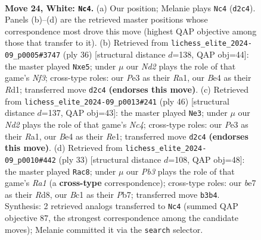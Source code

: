 \documentclass[11pt]{article}
\begin{document}
\clearpage

\begin{figure}[p]\centering
\begin{subfigure}{0.46\textwidth}\centering
\resizebox{\linewidth}{!}{%
\newchessgame
\chessboard[
  setfen={rnb5/1p1nb1k1/p2rppp1/7p/4B3/1P2P1P1/P1pNPK1P/R1B1R3 w - - 4 24},
  showmover=false,
  pgfstyle=straightmove, color=movearrow, markmove={d2-c4}
]}
\caption{}
\end{subfigure}\hfill
\begin{subfigure}{0.46\textwidth}\centering
\resizebox{\linewidth}{!}{%
\newchessgame
\chessboard[
  setfen={r2r4/1b1nkppp/p3p3/1p2n3/P1p1P3/2P1BNP1/1P3P1P/R2R1BK1 w - - 2 19},
  showmover=false,
  pgfstyle=straightmove, color=movearrow, markmove={f3-e5}
]}
\caption{}
\end{subfigure}
\\[4pt]
\begin{subfigure}{0.46\textwidth}\centering
\resizebox{\linewidth}{!}{%
\newchessgame
\chessboard[
  setfen={3n1rk1/p1rbb1pp/4pp2/Ppp5/2N2P2/2P3PB/1P3B1P/R3R1K1 w - - 0 24},
  showmover=false,
  pgfstyle=straightmove, color=movearrow, markmove={c4-e3}
]}
\caption{}
\end{subfigure}\hfill
\begin{subfigure}{0.46\textwidth}\centering
\resizebox{\linewidth}{!}{%
\newchessgame
\chessboard[
  setfen={r2r2k1/pp2ppbp/n5p1/3nPb2/1P6/P4NP1/1B1N1PBP/R3R1K1 b - - 3 17},
  showmover=false,
  pgfstyle=straightmove, color=movearrow, markmove={a8-c8}
]}
\caption{}
\end{subfigure}
\caption{\textbf{Move 24, White: \texttt{Nc4}.} (a) Our position; Melanie plays \texttt{Nc4} (\texttt{d2c4}). Panels (b)--(d) are the retrieved master positions whose correspondence most drove this move (highest QAP objective among those that transfer to it). (b) Retrieved from \texttt{lichess\_elite\_2024-09\_p0005\#3747} (ply 36) [structural distance $d$=138, QAP obj=44]: the master played \texttt{Nxe5}; under $\mu$ our \emph{Nd2} plays the role of that game's \emph{Nf3}; cross-type roles: our \emph{P}e3 as their \emph{R}a1, our \emph{B}e4 as their \emph{R}d1; transferred move \texttt{d2c4} \textbf{(endorses this move)}. (c) Retrieved from \texttt{lichess\_elite\_2024-09\_p0013\#241} (ply 46) [structural distance $d$=137, QAP obj=43]: the master played \texttt{Ne3}; under $\mu$ our \emph{Nd2} plays the role of that game's \emph{Nc4}; cross-type roles: our \emph{P}e3 as their \emph{R}a1, our \emph{B}e4 as their \emph{R}e1; transferred move \texttt{d2c4} \textbf{(endorses this move)}. (d) Retrieved from \texttt{lichess\_elite\_2024-09\_p0010\#442} (ply 33) [structural distance $d$=108, QAP obj=48]: the master played \texttt{Rac8}; under $\mu$ our \emph{Pb3} plays the role of that game's \emph{Ra1} (a \textbf{cross-type} correspondence); cross-type roles: our \emph{b}e7 as their \emph{R}d8, our \emph{B}c1 as their \emph{P}b7; transferred move \texttt{b3b4}. Synthesis: 2 retrieved analogs transferred to \texttt{Nc4} (summed QAP objective 87, the strongest correspondence among the candidate moves); Melanie committed it via the \texttt{search} selector.}
\label{fig:thought-m46}
\end{figure}
\end{document}
